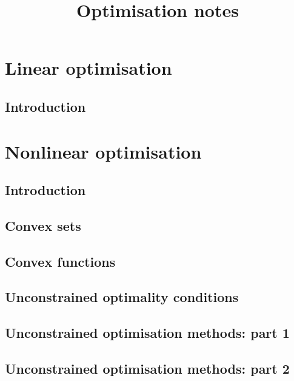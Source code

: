 \documentclass{bookest}
\title{Optimisation notes}
\begin{document}
	\maketitle

	\tableofcontents
	
	\part{Linear optimisation}
	
	\chapter{Introduction}
	
		
	
	\part{Nonlinear optimisation}
		
	\chapter{Introduction}
	
	
	\chapter{Convex sets}
	
	
	\chapter{Convex functions}
	
	
	\chapter{Unconstrained optimality conditions}
	
	
	\chapter{Unconstrained optimisation methods: part 1}
	
	
	\chapter{Unconstrained optimisation methods: part 2}
	
	
\end{document}
